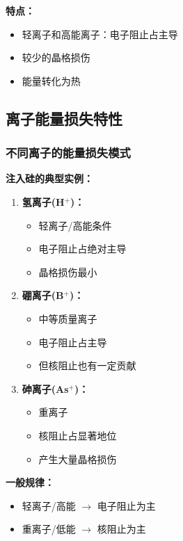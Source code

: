 \documentclass[UTF8,12pt,a4paper]{ctexart}
\begin{document}
\textbf{特点：}
\begin{itemize}
    \item 轻离子和高能离子：电子阻止占主导
    \item 较少的晶格损伤
    \item 能量转化为热
\end{itemize}

\subsection{离子能量损失特性}

\subsubsection{不同离子的能量损失模式}

\textbf{注入硅的典型实例：}

\begin{enumerate}
    \item \textbf{氢离子(H$^+$)：}
    \begin{itemize}
        \item 轻离子/高能条件
        \item 电子阻止占绝对主导
        \item 晶格损伤最小
    \end{itemize}
    
    \item \textbf{硼离子(B$^+$)：}
    \begin{itemize}
        \item 中等质量离子
        \item 电子阻止占主导
        \item 但核阻止也有一定贡献
    \end{itemize}
    
    \item \textbf{砷离子(As$^+$)：}
    \begin{itemize}
        \item 重离子
        \item 核阻止占显著地位
        \item 产生大量晶格损伤
    \end{itemize}
\end{enumerate}

\textbf{一般规律：}
\begin{itemize}
    \item 轻离子/高能 $\rightarrow$ 电子阻止为主
    \item 重离子/低能 $\rightarrow$ 核阻止为主
\end{itemize}
\end{document}
